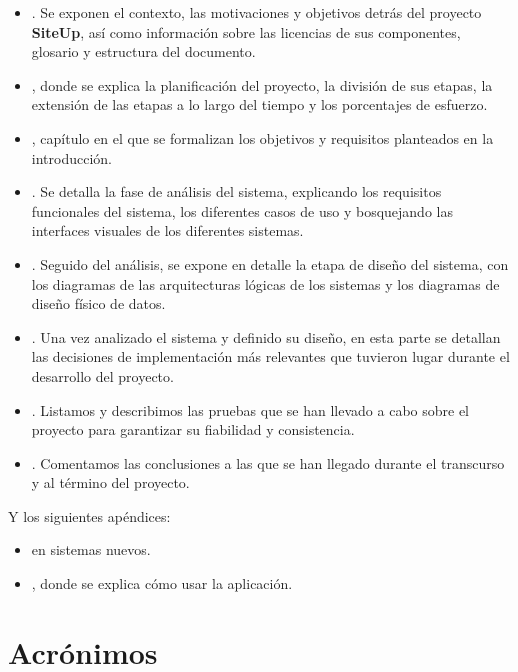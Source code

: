 \begin{itemize}
\item \textbf{}. Se exponen el contexto, las motivaciones y
  objetivos detrás del proyecto \textbf{SiteUp}, así como información sobre las
  licencias de sus componentes, glosario y estructura del documento.

\item \textbf{}, donde se explica la planificación del
  proyecto, la división de sus etapas, la extensión de las etapas a lo largo del
  tiempo y los porcentajes de esfuerzo.

\item \textbf{}, capítulo en el que se formalizan los
  objetivos y requisitos planteados en la introducción.

\item \textbf{}. Se detalla la fase de análisis del
  sistema, explicando los requisitos funcionales del sistema, los diferentes
  casos de uso y bosquejando las interfaces visuales de los diferentes sistemas.

\item \textbf{}. Seguido del análisis, se expone en detalle
  la etapa de diseño del sistema, con los diagramas de las arquitecturas lógicas
  de los sistemas y los diagramas de diseño físico de datos.

\item \textbf{}. Una vez analizado el sistema y
  definido su diseño, en esta parte se detallan las decisiones de implementación
  más relevantes que tuvieron lugar durante el desarrollo del proyecto.

\item \textbf{}. Listamos y describimos las pruebas que se
  han llevado a cabo sobre el proyecto para garantizar su fiabilidad y
  consistencia.

\item \textbf{}. Comentamos las conclusiones a las
  que se han llegado durante el transcurso y al término del proyecto.
\end{itemize}

Y los siguientes apéndices:
\begin{itemize}
\item \textbf{} en sistemas nuevos.
\item \textbf{}, donde se explica cómo usar la aplicación.
\end{itemize}

\section{Acrónimos}




